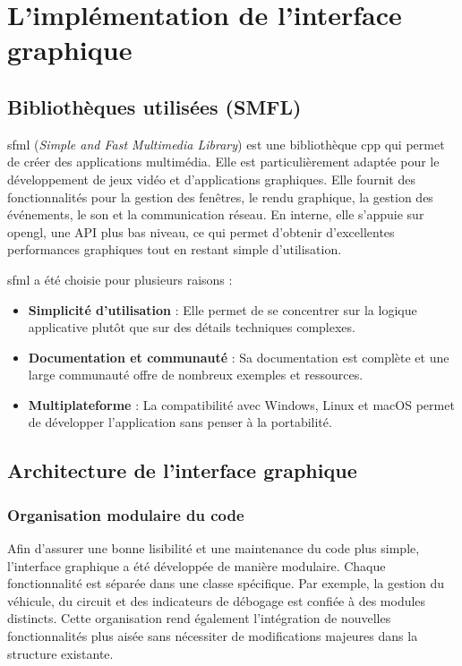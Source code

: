 \section{L'implémentation de l'interface graphique}\label{sec:l'implementation-de-l-interface-graphique}
\subsection{Bibliothèques utilisées (SMFL)}\label{subsec:sfml}
\gls{sfml} (\textit{Simple and Fast Multimedia Library}) est une bibliothèque \gls{cpp} qui permet de créer des applications multimédia.
Elle est particulièrement adaptée pour le développement de jeux vidéo et d'applications graphiques.
Elle fournit des fonctionnalités pour la gestion des fenêtres, le rendu graphique, la gestion des événements, le son et la communication réseau.
En interne, elle s'appuie sur \gls{opengl}, une API plus bas niveau, ce qui permet d'obtenir d'excellentes performances graphiques tout en restant simple d'utilisation.

\gls{sfml} a été choisie pour plusieurs raisons :
\begin{itemize}
    \item \textbf{Simplicité d'utilisation} : Elle permet de se concentrer sur la logique applicative plutôt que sur des détails techniques complexes.
    \item \textbf{Documentation et communauté} : Sa documentation\cite{documentationSFML} est complète et une large communauté offre de nombreux exemples et ressources.
    \item \textbf{Multiplateforme} : La compatibilité avec Windows, Linux et macOS permet de développer l'application sans penser à la portabilité.
\end{itemize}

\subsection{Architecture de l'interface graphique}\label{subsec:architecture-de-l-interface-graphique}
\subsubsection{Organisation modulaire du code}\label{subsubsec:organisation-modulaire-du-code}
Afin d'assurer une bonne lisibilité et une maintenance du code plus simple, l'interface graphique a été développée de manière modulaire.
Chaque fonctionnalité est séparée dans une classe spécifique.
Par exemple, la gestion du véhicule, du circuit et des indicateurs de débogage est confiée à des modules distincts.
Cette organisation rend également l'intégration de nouvelles fonctionnalités plus aisée sans nécessiter de modifications majeures dans la structure existante.

